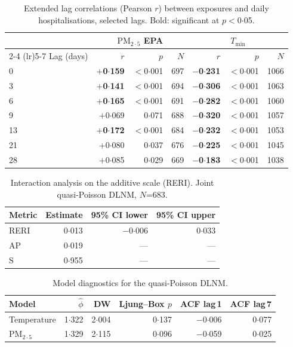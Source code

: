 \documentclass[12pt]{article}
\begin{document}
\begin{table}[ht]
\centering
\caption{Extended lag correlations (Pearson $r$) between exposures and
daily hospitalisations, selected lags. Bold: significant at $p$$<$0${\cdot}$05.}
\label{etab:extended_lags}
\begin{tabular}{lrrrrrr}
\toprule
 & \multicolumn{3}{c}{$\text{PM}_{2{\cdot}5}$ EPA} & \multicolumn{3}{c}{$T_\mathrm{min}$} \\
\cmidrule(lr){2-4} \cmidrule(lr){5-7}
Lag (days) & $r$ & $p$ & $N$ & $r$ & $p$ & $N$ \\
\midrule
 0 & \textbf{$+$0${\cdot}$159} & $<$0${\cdot}$001 & 697 & \textbf{$-$0${\cdot}$231} & $<$0${\cdot}$001 & 1066 \\
 3 & \textbf{$+$0${\cdot}$141} & $<$0${\cdot}$001 & 694 & \textbf{$-$0${\cdot}$306} & $<$0${\cdot}$001 & 1063 \\
 6 & \textbf{$+$0${\cdot}$165} & $<$0${\cdot}$001 & 691 & \textbf{$-$0${\cdot}$282} & $<$0${\cdot}$001 & 1060 \\
 9 &  $+$0${\cdot}$069 & 0${\cdot}$071 & 688 & \textbf{$-$0${\cdot}$320} & $<$0${\cdot}$001 & 1057 \\
13 & \textbf{$+$0${\cdot}$172} & $<$0${\cdot}$001 & 684 & \textbf{$-$0${\cdot}$232} & $<$0${\cdot}$001 & 1053 \\
21 &  $+$0${\cdot}$080 & 0${\cdot}$037 & 676 & \textbf{$-$0${\cdot}$225} & $<$0${\cdot}$001 & 1045 \\
28 &  $+$0${\cdot}$085 & 0${\cdot}$029 & 669 & \textbf{$-$0${\cdot}$183} & $<$0${\cdot}$001 & 1038 \\
\bottomrule
\end{tabular}
\end{table}

\begin{table}[ht]
\centering
\caption{Interaction analysis on the additive scale (RERI). Joint
quasi-Poisson DLNM, $N$=683.}
\label{etab:reri}
\begin{tabular}{lrrr}
\toprule
Metric & Estimate & 95\% CI lower & 95\% CI upper \\
\midrule
RERI & 0${\cdot}$013 & $-$0${\cdot}$006 & 0${\cdot}$033 \\
AP   & 0${\cdot}$019 &  ---     &  ---  \\
S    & 0${\cdot}$955 &  ---     &  ---  \\
\bottomrule
\end{tabular}
\end{table}

\begin{table}[ht]
\centering
\caption{Model diagnostics for the quasi-Poisson DLNM.}
\label{etab:diagnostics}
\begin{tabular}{lrrrrr}
\toprule
Model & $\hat{\phi}$ & DW & Ljung--Box $p$ & ACF lag\,1 & ACF lag\,7 \\
\midrule
Temperature & 1${\cdot}$322 & 2${\cdot}$004 & 0${\cdot}$137 & $-$0${\cdot}$006 & 0${\cdot}$077 \\
$\text{PM}_{2{\cdot}5}$  & 1${\cdot}$329 & 2${\cdot}$115 & 0${\cdot}$096 & $-$0${\cdot}$059 & 0${\cdot}$025 \\
\bottomrule
\end{tabular}
\end{table}
\end{document}
